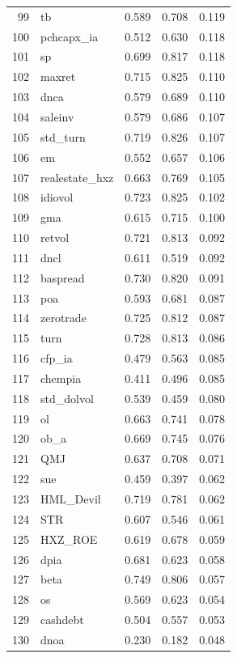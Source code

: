 \begin{footnotesize}
\begin{longtable}{rl|c|c|c}
		99 & tb & 0.589 & 0.708 & 0.119 \\ 
		100 & pchcapx\_ia & 0.512 & 0.630 & 0.118 \\ 
		101 & sp & 0.699 & 0.817 & 0.118 \\ 
		102 & maxret & 0.715 & 0.825 & 0.110 \\ 
		103 & dnca & 0.579 & 0.689 & 0.110 \\ 
		104 & saleinv & 0.579 & 0.686 & 0.107 \\ 
		105 & std\_turn & 0.719 & 0.826 & 0.107 \\ 
		106 & em & 0.552 & 0.657 & 0.106 \\ 
		107 & realestate\_hxz & 0.663 & 0.769 & 0.105 \\ 
		108 & idiovol & 0.723 & 0.825 & 0.102 \\ 
		109 & gma & 0.615 & 0.715 & 0.100 \\ 
		110 & retvol & 0.721 & 0.813 & 0.092 \\ 
		111 & dncl & 0.611 & 0.519 & 0.092 \\ 
		112 & baspread & 0.730 & 0.820 & 0.091 \\ 
		113 & poa & 0.593 & 0.681 & 0.087 \\ 
		114 & zerotrade & 0.725 & 0.812 & 0.087 \\ 
		115 & turn & 0.728 & 0.813 & 0.086 \\ 
		116 & cfp\_ia & 0.479 & 0.563 & 0.085 \\ 
		117 & chempia & 0.411 & 0.496 & 0.085 \\ 
		118 & std\_dolvol & 0.539 & 0.459 & 0.080 \\ 
		119 & ol & 0.663 & 0.741 & 0.078 \\ 
		120 & ob\_a & 0.669 & 0.745 & 0.076 \\ 
		121 & QMJ & 0.637 & 0.708 & 0.071 \\ 
		122 & sue & 0.459 & 0.397 & 0.062 \\ 
		123 & HML\_Devil & 0.719 & 0.781 & 0.062 \\ 
		124 & STR & 0.607 & 0.546 & 0.061 \\ 
		125 & HXZ\_ROE & 0.619 & 0.678 & 0.059 \\ 
		126 & dpia & 0.681 & 0.623 & 0.058 \\ 
		127 & beta & 0.749 & 0.806 & 0.057 \\ 
		128 & os & 0.569 & 0.623 & 0.054 \\ 
		129 & cashdebt & 0.504 & 0.557 & 0.053 \\ 
		130 & dnoa & 0.230 & 0.182 & 0.048 \\ 

\end{longtable}
\end{footnotesize}
